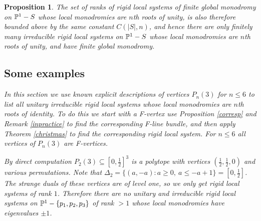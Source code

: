 \documentclass[11pt]{amsart}
\newcommand\Par{\mathcal{P}\text{ar} }
\newtheorem{proposition}[theorem]{Proposition}
\numberwithin{theorem}{subsection}
\newtheorem{example}[theorem]{\bf Example}
\begin{document}
{\begin{proposition}
The set of ranks of rigid local systems of finite global monodromy on $\Bbb{P}^1-S$ whose local monodromies are $n$th roots of unity, is also therefore bounded above by the same constant $C(|S|, n)$, and hence there are only finitely many irreducible rigid local systems on $\Bbb{P}^1-S$ whose local monodromies are $n$th roots of unity, and have finite global monodromy.
\fi

\subsection{Some examples}\label{smalln}

In this section we use known explicit descriptions of vertices $P_n(3)$ for $n\leq 6$ to list all unitary irreducible rigid local systems whose local monodromies are $n$th roots of identity.  To do this we  start with a F-vertex use Proposition \ref{corresp} and Remark \ref{inpractice} to find the corresponding F-line bundle, and then apply Theorem \ref{christmas} to find the corresponding rigid local system. For $n\leq 6$ all vertices of $P_n(3)$ are F-vertices.


By direct computation $P_2(3)\subseteq[0,\frac{1}{2}]^3$ is a polytope with vertices $(\frac{1}{2}, \frac{1}{2},0)$ and various permutations. Note that $\Delta_2=\{(a,-a): a\geq 0,\ a\leq -a +1\}=[0,\frac{1}{2}]$.
The strange duals of these vertices are of level one, so we only get rigid local systems of rank $1$. Therefore there are no unitary and irreducible  rigid local systems on $\Bbb{P}^{1}-\{p_1,p_2,p_3\}$ of rank $>1$ whose local monodromies have eigenvalues $\pm 1$.


\end{proposition}}
\end{document}
